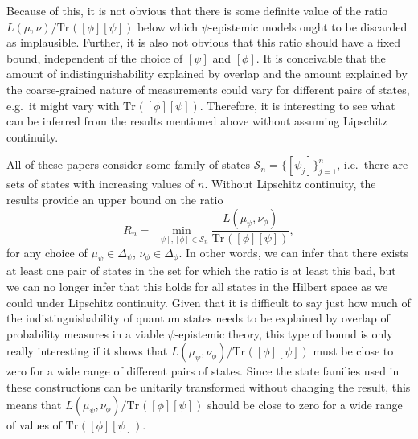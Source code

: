 \documentclass[DIV=calc,fontsize=12pt]{scrartcl} %
\theoremstyle{definition}
\theoremstyle{plain}
\newcommand{\Proj}[1]{\ensuremath{\left [ #1 \right ]}}
\newcommand{\Tr}[2][]{\ensuremath{\text{Tr}_{#1} \left ( #2 \right )}}
\begin{document}
Because of this, it is not obvious that there is some definite value
of the ratio $L(\mu,\nu) / \Tr{\Proj{\phi}\Proj{\psi}}$ below which
$\psi$-epistemic models ought to be discarded as implausible.
Further, it is also not obvious that this ratio should have a fixed
bound, independent of the choice of $\Proj{\psi}$ and $\Proj{\phi}$.
It is conceivable that the amount of indistinguishability explained by
overlap and the amount explained by the coarse-grained nature of
measurements could vary for different pairs of states, e.g.\ it might
vary with $\Tr{\Proj{\phi}\Proj{\psi}}$.  Therefore, it is interesting
to see what can be inferred from the results mentioned above
\cite{Maroney2012, Barrett2013, Leifer2014, Branciard2014} without
assuming Lipschitz continuity.

All of these papers consider some family of states $\mathcal{S}_n =
\{\Proj{\psi_j}\}_{j=1}^n$, i.e.\ there are sets of states with
increasing values of $n$.  Without Lipschitz continuity, the results
provide an upper bound on the ratio
\begin{equation}
R_n = \min_{\Proj{\psi}, \Proj{\phi} \in \mathcal{S}_n}
\frac{L(\mu_{\psi},\nu_{\phi})}{\Tr{\Proj{\phi}\Proj{\psi}}},
\end{equation}
for any choice of $\mu_{\psi} \in \Delta_{\psi}$, $\nu_{\phi} \in
\Delta_{\phi}$.  In other words, we can infer that there exists at
least one pair of states in the set for which the ratio is at least
this bad, but we can no longer infer that this holds for all states in
the Hilbert space as we could under Lipschitz continuity.  Given that
it is difficult to say just how much of the indistinguishability of
quantum states needs to be explained by overlap of probability
measures in a viable $\psi$-epistemic theory, this type of bound is
only really interesting if it shows that
$L(\mu_{\psi},\nu_{\phi})/\Tr{\Proj{\phi}\Proj{\psi}}$ must be close
to zero for a wide range of different pairs of states.  Since the
state families used in these constructions can be unitarily
transformed without changing the result, this means that
$L(\mu_{\psi},\nu_{\phi})/\Tr{\Proj{\phi}\Proj{\psi}}$ should be close
to zero for a wide range of values of $\Tr{\Proj{\phi}\Proj{\psi}}$.
\end{document}
